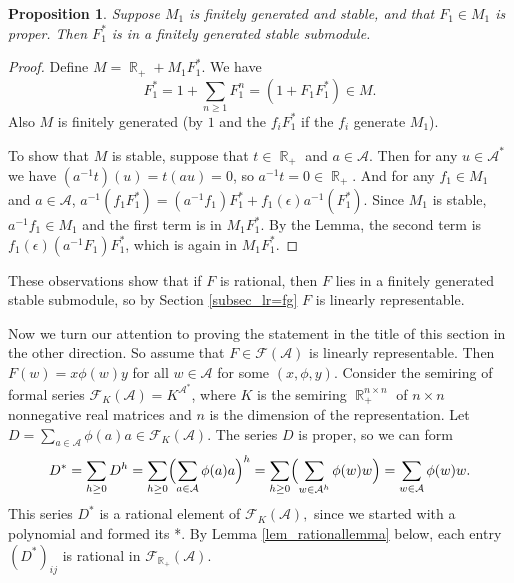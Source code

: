 \documentclass{kepart2010}
\theoremstyle{plain}
\newtheorem{prop}[thm]{Proposition}
\theoremstyle{definition}
\theoremstyle{remark}
\theoremstyle{definition}
\numberwithin{equation}{section}
\begin{document}
\begin{prop}
Suppose $M_{1}$ is finitely generated and stable, and that $F_{1}
\in M_{1}$ is proper. Then $F_{1}^{*}$ is in a finitely generated
stable submodule.
\end{prop}
\begin{proof}
Define $M=\operatorname{\mathbb R}_{+} + M_{1}F_{1}^{*}$.  We have
$$F_{1}^{*}=1+ \sum_{n \geq 1}F_{1}^{n}=(1+
F_1F_{1}^{*})\in M.$$  Also $M$ is finitely generated (by $1$ and
the $f_iF_1^{*}$ if the $f_i$ generate $M_1$).

To show that $M$ is stable, suppose that $t \in \operatorname{\mathbb R}_{+}$ and $a \in
{{\mathcal A}}$. Then for any $u \in {{\mathcal A}}^{*}$ we have $(a^{-1} t)(u)=t(au)=0$,
so $a^{-1} t=0 \in \operatorname{\mathbb R}_{+}$. And for any $f_1 \in M_1$ and $a \in
{{\mathcal A}}$,
$a^{-1}(f_1F_1^{*})=(a^{-1}f_1)F_1^{*}+f_1(\epsilon)a^{-1}(F_1^{*})$.
Since $M_1$ is stable, $a^{-1}f_1 \in
M_1$ and the first term is in $M_1 F_1^{*}$. By the Lemma, the
second term is $f_1(\epsilon)(a^{-1}F_1)F_1^{*}$, which is again in
$M_1 F_1^{*}$.
\end{proof}

These observations show that if $F$ is rational, then $F$ lies in a
finitely generated stable submodule, so by Section
\ref{subsec_lr=fg} $F$ is linearly representable.

Now we turn our attention to proving the statement in the title of
this section in the other direction. So assume that $F \in {\mathcal F ({{\mathcal A}})}$ is
linearly representable. Then $F(w) = x  \phi (w) y$ for all $w \in
{{\mathcal A}}$ for some $(x,\phi,y)$. Consider the semiring of formal series
$\mathcal{F}_{K}({{\mathcal A}}) = K^{{{\mathcal A}}^{*}}$, where $K$ is the semiring
$\operatorname{\mathbb R}_{+}^{n \times n}$ of $n \times n$ nonnegative real matrices and
$n$ is the dimension of the representation.
Let $D = \sum_{a \in {{\mathcal A}}} \phi(a) a \in \mathcal{F}_{K}({{\mathcal A}}).$  The
 series $D$ is proper, so we can form
 \begin{equation} D^{*} = \sum_{h \geq 0}D^{h}
        = \sum_{h \geq 0} \Bigl( \sum_{a \in {{\mathcal A}}} \phi(a) a \Bigr)^{h}
        =\sum_{h \geq 0}\Bigl(\sum_{w \in {{\mathcal A}}^{h}} \phi(w)w \Bigr)
        =\sum_{w \in {{\mathcal A}}}\phi(w) w.
\end{equation} This series $D^{*}$ is a rational element of
$\mathcal{F}_{K}({{\mathcal A}}),$  since we started with a polynomial and
formed its *. By Lemma \ref{lem_rationallemma} below, each entry
$(D^{*})_{ij}$ is rational in $\mathcal{F}_{\operatorname{\mathbb R}_{+}}({{\mathcal A}})$.
\end{document}
